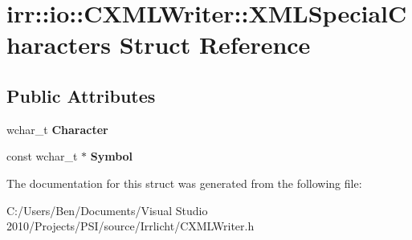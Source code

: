 \hypertarget{structirr_1_1io_1_1_c_x_m_l_writer_1_1_x_m_l_special_characters}{\section{irr\-:\-:io\-:\-:C\-X\-M\-L\-Writer\-:\-:X\-M\-L\-Special\-Characters Struct Reference}
\label{structirr_1_1io_1_1_c_x_m_l_writer_1_1_x_m_l_special_characters}
}
\subsection*{Public Attributes}
\begin{DoxyCompactItemize}
\item 
\hypertarget{structirr_1_1io_1_1_c_x_m_l_writer_1_1_x_m_l_special_characters_aef4e5c76a4691bcc904958899faa3332}{wchar\-\_\-t {\bfseries Character}}\label{structirr_1_1io_1_1_c_x_m_l_writer_1_1_x_m_l_special_characters_aef4e5c76a4691bcc904958899faa3332}

\item 
\hypertarget{structirr_1_1io_1_1_c_x_m_l_writer_1_1_x_m_l_special_characters_ae2a4894411968d76b12a9c82e265465c}{const wchar\-\_\-t $\ast$ {\bfseries Symbol}}\label{structirr_1_1io_1_1_c_x_m_l_writer_1_1_x_m_l_special_characters_ae2a4894411968d76b12a9c82e265465c}

\end{DoxyCompactItemize}


The documentation for this struct was generated from the following file\-:\begin{DoxyCompactItemize}
\item 
C\-:/\-Users/\-Ben/\-Documents/\-Visual Studio 2010/\-Projects/\-P\-S\-I/source/\-Irrlicht/C\-X\-M\-L\-Writer.\-h\end{DoxyCompactItemize}
